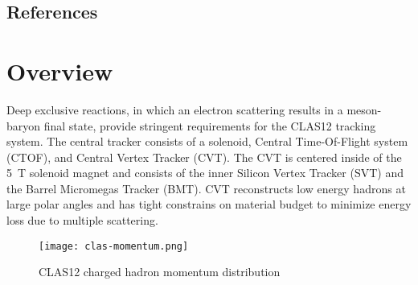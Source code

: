 \subsection{References}

\newpage
\section{Overview}

Deep exclusive reactions, in which an electron scattering results in a meson-baryon final state, provide stringent requirements for the CLAS12 tracking system. The central tracker consists of a solenoid, Central Time-Of-Flight system (CTOF), and Central Vertex Tracker (CVT). The CVT is centered inside of the  5~T solenoid magnet and consists of the inner Silicon Vertex Tracker (SVT) and the Barrel Micromegas Tracker (BMT). CVT reconstructs low energy hadrons at large polar angles and has tight constrains on material budget to minimize energy loss due to multiple scattering.

\begin{wrapfigure}{l}{0.5\columnwidth}
\texttt{[image: clas-momentum.png]}
\caption{CLAS12 charged hadron momentum distribution}
\label{fig:clas-momentum}
\end{wrapfigure}

